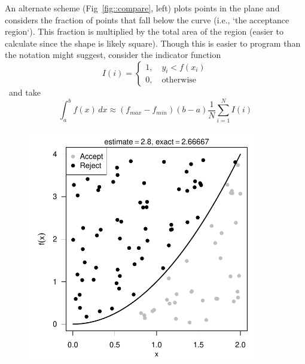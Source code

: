 \documentclass[11pt]{article}
\begin{document}
An alternate scheme (Fig~\ref{fig::compare}, left) plots points in the plane and considers the fraction of points that fall below the curve (i.e., `the acceptance region`). This fraction is multiplied by the total area of the region (easier to calculate since the shape is likely square). Though this is easier to program than the notation might suggest, consider the indicator function \[I(i) = \begin{cases}1, \quad y_i < f(x_i)\\0, \quad\text{otherwise}\end{cases}\]~and take~\[\int_a^b f(x)\,dx \approx(f_{max}-f_{min})(b-a)\dfrac{1}{N} \sum_{i=1}^N I(i)\]
%
\begin{figure}[h!]\centering
\begin{minipage}{0.48\textwidth}\centering
\includegraphics[width=0.9\textwidth]{5_integration/rejection.pdf}

\end{minipage}
\begin{minipage}{0.48\textwidth}


\end{minipage}
\end{figure}
\end{document}
